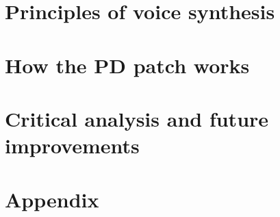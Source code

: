 



	
	\begin{multicols}{2}
	
		\section{Principles of voice synthesis}
		
		
		\section{How the PD patch works}
		
		
		\section{Critical analysis and future improvements}
		
		
	\end{multicols}
	
	\pagebreak
	
	\appendix
	\section{Appendix}
	
	
			
	
	
		
	
	


